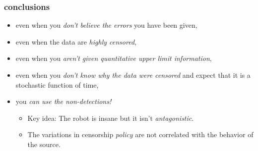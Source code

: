 \documentclass[pdftex]{beamer}
\begin{document}
\begin{frame}
  \frametitle{conclusions}
  \begin{itemize}
  \item even when you \emph{don't believe the errors} you have been given,
  \item even when the data are \emph{highly censored},
  \item even when you \emph{aren't given quantitative upper limit information},
  \item even when you \emph{don't know why the data were censored} and expect that it is a stochastic function of time,
  \item you \emph{can use the non-detections!}
    \begin{itemize}
    \item Key idea: The robot is insane but it isn't \emph{antagonistic}.
    \item The variations in censorship \emph{policy} are not correlated with the behavior of the source.
    \end{itemize}
  \end{itemize}
\end{frame}
\end{document}
